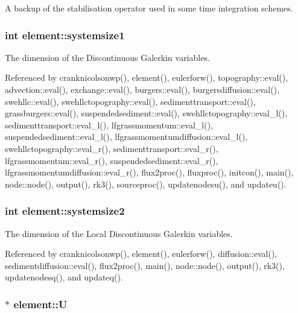 A backup of the stabilisation operator used in some time integration schemes. 

\subsubsection[{systemsize1}]{\setlength{\rightskip}{0pt plus 5cm}int element\-::systemsize1\hspace{0.3cm}{\ttfamily [static]}}\label{classelement_ab273d8a7b662315d58ed949018e26ed2}


The dimension of the Discontinuous Galerkin variables. 



Referenced by cranknicolsonwp(), element(), eulerforw(), topography\-::eval(), advection\-::eval(), exchange\-::eval(), burgers\-::eval(), burgersdiffusion\-::eval(), swehllc\-::eval(), swehllctopography\-::eval(), sedimenttransport\-::eval(), grassburgers\-::eval(), suspendedsediment\-::eval(), swehllctopography\-::eval\-\_\-l(), sedimenttransport\-::eval\-\_\-l(), lfgrassmomentum\-::eval\-\_\-l(), suspendedsediment\-::eval\-\_\-l(), lfgrassmomentumdiffusion\-::eval\-\_\-l(), swehllctopography\-::eval\-\_\-r(), sedimenttransport\-::eval\-\_\-r(), lfgrassmomentum\-::eval\-\_\-r(), suspendedsediment\-::eval\-\_\-r(), lfgrassmomentumdiffusion\-::eval\-\_\-r(), flux2proc(), fluxproc(), initcon(), main(), node\-::node(), output(), rk3(), sourceproc(), updatenodesu(), and updateu().

\subsubsection[{systemsize2}]{\setlength{\rightskip}{0pt plus 5cm}int element\-::systemsize2\hspace{0.3cm}{\ttfamily [static]}}\label{classelement_a32e743b830c5d986454bbcfe7911ce30}


The dimension of the Local Discontinuous Galerkin variables. 



Referenced by cranknicolsonwp(), element(), eulerforw(), diffusion\-::eval(), sedimentdiffusion\-::eval(), flux2proc(), main(), node\-::node(), output(), rk3(), updatenodesq(), and updateq().

\subsubsection[{U}]{$\ast$ element\-::\-U}\label{classelement_ab5bba2272163b3ac622f4de3293da7de}


